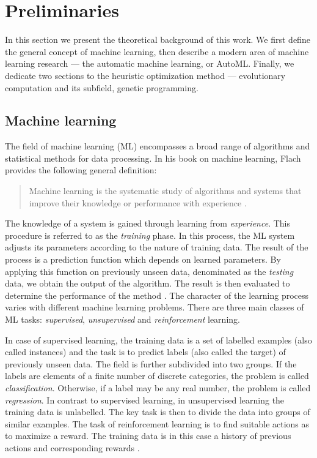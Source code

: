 \chapter{Preliminaries} \label{ch1:prelim}

In this section we present the theoretical background of this work. We first
define the general concept of machine learning, then describe a modern area
of machine learning research --- the automatic machine learning, or AutoML.
Finally, we dedicate two sections to the heuristic optimization method ---
evolutionary computation and its subfield, genetic programming.

\section{Machine learning} \label{sec:ml}
The field of machine learning (ML) encompasses a broad range of
algorithms and statistical methods for data processing. In his book on machine
learning, Flach provides the following general definition:

\blockquote{Machine learning is the systematic study of algorithms and systems
that improve their knowledge or performance with experience
\citep{Flach:2012:MLA:2490546}.}

The knowledge of a system is gained through learning from \emph{experience}.
This procedure is referred to as the \emph{training} phase. In this process, 
the ML system adjusts its parameters according to the nature of training data.
The result of the process is a prediction function which depends on learned
parameters. By applying this function on previously unseen data, denominated 
as the \emph{testing} data, we obtain the output of the algorithm. The 
result is then evaluated to determine the performance of the method 
\citep[p.~2]{Bishop:2006:PRM:1162264}. The character of the learning process
varies with different machine learning problems. There are three main classes 
of ML tasks: \emph{supervised}, \emph{unsupervised} and \emph{reinforcement} 
learning.

In case of supervised learning, the training data is a set of labelled examples
(also called instances)
and the task is to predict labels (also called the target) of previously unseen data. The field is 
further subdivided into two groups. If the labels are elements of a finite 
number of discrete categories, the problem is called \emph{classification}. 
Otherwise, if a label may be any real number, the problem is called \emph{regression}.
In contrast to supervised learning, in unsupervised learning the training data 
is unlabelled. The key task is then to divide the data into groups of 
similar examples. The task of reinforcement learning is to find suitable
actions as to maximize a reward. The training data is in this case a history of
previous actions and corresponding rewards \citep[p.~3]{Bishop:2006:PRM:1162264}.

